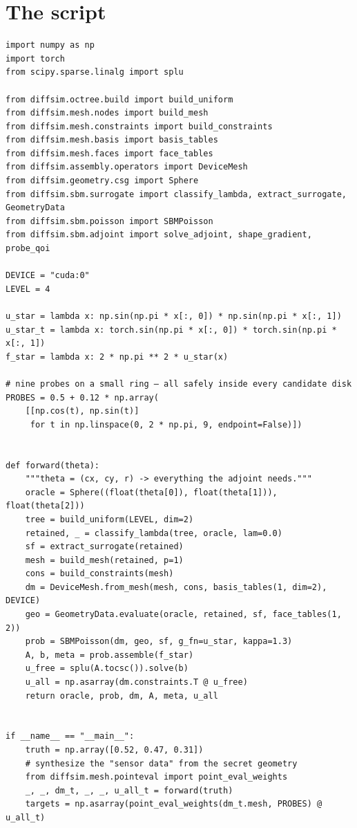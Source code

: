 \section*{The script}
\begin{lstlisting}
import numpy as np
import torch
from scipy.sparse.linalg import splu

from diffsim.octree.build import build_uniform
from diffsim.mesh.nodes import build_mesh
from diffsim.mesh.constraints import build_constraints
from diffsim.mesh.basis import basis_tables
from diffsim.mesh.faces import face_tables
from diffsim.assembly.operators import DeviceMesh
from diffsim.geometry.csg import Sphere
from diffsim.sbm.surrogate import classify_lambda, extract_surrogate, GeometryData
from diffsim.sbm.poisson import SBMPoisson
from diffsim.sbm.adjoint import solve_adjoint, shape_gradient, probe_qoi

DEVICE = "cuda:0"
LEVEL = 4

u_star = lambda x: np.sin(np.pi * x[:, 0]) * np.sin(np.pi * x[:, 1])
u_star_t = lambda x: torch.sin(np.pi * x[:, 0]) * torch.sin(np.pi * x[:, 1])
f_star = lambda x: 2 * np.pi ** 2 * u_star(x)

# nine probes on a small ring — all safely inside every candidate disk
PROBES = 0.5 + 0.12 * np.array(
    [[np.cos(t), np.sin(t)]
     for t in np.linspace(0, 2 * np.pi, 9, endpoint=False)])


def forward(theta):
    """theta = (cx, cy, r) -> everything the adjoint needs."""
    oracle = Sphere((float(theta[0]), float(theta[1])), float(theta[2]))
    tree = build_uniform(LEVEL, dim=2)
    retained, _ = classify_lambda(tree, oracle, lam=0.0)
    sf = extract_surrogate(retained)
    mesh = build_mesh(retained, p=1)
    cons = build_constraints(mesh)
    dm = DeviceMesh.from_mesh(mesh, cons, basis_tables(1, dim=2), DEVICE)
    geo = GeometryData.evaluate(oracle, retained, sf, face_tables(1, 2))
    prob = SBMPoisson(dm, geo, sf, g_fn=u_star, kappa=1.3)
    A, b, meta = prob.assemble(f_star)
    u_free = splu(A.tocsc()).solve(b)
    u_all = np.asarray(dm.constraints.T @ u_free)
    return oracle, prob, dm, A, meta, u_all


if __name__ == "__main__":
    truth = np.array([0.52, 0.47, 0.31])
    # synthesize the "sensor data" from the secret geometry
    from diffsim.mesh.pointeval import point_eval_weights
    _, _, dm_t, _, _, u_all_t = forward(truth)
    targets = np.asarray(point_eval_weights(dm_t.mesh, PROBES) @ u_all_t)


\end{lstlisting}
